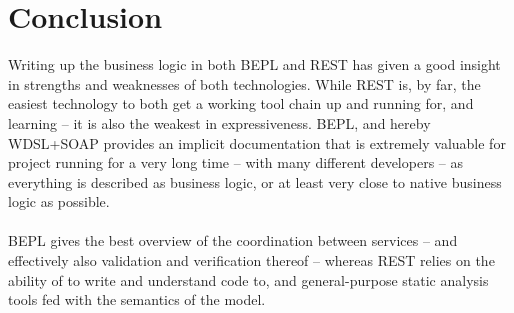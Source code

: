 \chapter{Conclusion}
Writing up the business logic in both BEPL and REST has given a good insight in strengths and weaknesses of both technologies. While REST is, by far, the easiest technology to both get a working tool chain up and running for, and learning -- it is also the weakest in expressiveness.  BEPL, and hereby WDSL+SOAP provides an implicit documentation that is extremely valuable for project running for a very long time -- with many different developers -- as everything is described as business logic, or at least very close to native business logic as possible.\\\\
BEPL gives the best overview of the coordination between services -- and effectively also validation and verification thereof -- whereas REST relies on the ability of to write and understand code to, and general-purpose static analysis tools fed with the semantics of the model.